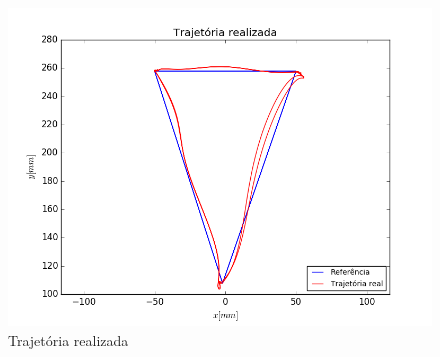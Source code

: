 \documentclass[]{politex}
\begin{document}
\begin{figure}[H]
	\centering
	\includegraphics[scale=0.39]{../../../Experimental/Aquisicoes/PIDSMCt_triangulo/xy.png}  
	\caption{Trajetória realizada}
	\label{fig:PIDSMCq_triangulo_xy}
\end{figure}
\end{document}
